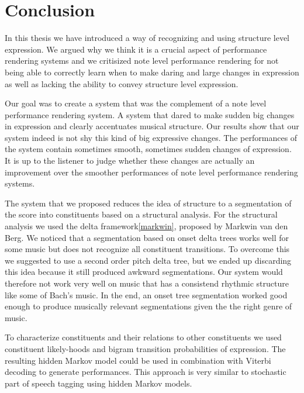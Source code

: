 \documentclass[a4paper,10pt]{article}
\begin{document}




\section{Conclusion}
\label{sec:conclusion}

In this thesis we have introduced a way of recognizing and using structure level expression. We argued why we think it is a crucial aspect of performance rendering systems and we critisized  note level performance rendering for not being able to correctly learn when to make daring and large changes in expression as well as lacking the ability to convey structure level expression. 

Our goal was to create a system that was the complement of a note level performance rendering system. A system that dared to make sudden big changes in expression and clearly accentuates musical structure. Our results show that our system indeed is not shy this kind of big expressive changes. The performances of the system contain sometimes smooth, sometimes sudden changes of expression. It is up to the listener to judge whether these changes are actually an improvement over the smoother performances of note level performance rendering systems.

The system that we proposed reduces the idea of structure to a segmentation of the score into constituents based on a structural analysis. For the structural analysis we used the delta framework\ref{markwin}, proposed by Markwin van den Berg. We noticed that a segmentation based on onset delta trees works well for some music but does not recognize all constituent transitions. To overcome this we suggested to use a second order pitch delta tree, but we ended up discarding this idea because it still produced awkward segmentations.  Our system would therefore not work very well on music that has a consistend rhythmic structure like some of Bach's music. In the end, an onset tree segmentation worked good enough to produce musically relevant segmentations given the the right genre of music.

To characterize constituents and their relations to other constituents we used constituent likely-hoods and bigram transition probabilities of expression. The resulting hidden Markov model could be used in combination with Viterbi decoding to generate performances. This approach is very similar to stochastic part of speech tagging using hidden Markov models.
\end{document}
